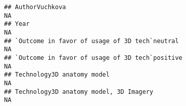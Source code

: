 \documentclass[]{article}
\begin{document}
\begin{verbatim}
## AuthorVuchkova                                                                                                                                                                                                                                                                                                                                                                                                                                                                        NA
## Year                                                                                                                                                                                                                                                                                                                                                                                                                                                                                  NA
## `Outcome in favor of usage of 3D tech`neutral                                                                                                                                                                                                                                                                                                                                                                                                                                         NA
## `Outcome in favor of usage of 3D tech`positive                                                                                                                                                                                                                                                                                                                                                                                                                                        NA
## Technology3D anatomy model                                                                                                                                                                                                                                                                                                                                                                                                                                                            NA
## Technology3D anatomy model, 3D Imagery                                                                                                                                                                                                                                                                                                                                                                                                                                                NA

\end{verbatim}
\end{document}
